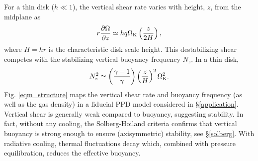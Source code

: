 \documentclass[iop, numberedappendix]{emulateapj}
\newcommand{\p}{\partial}
\def \OmK {\Omega_{\rm K}}
\begin{document}
For a thin disk ($h\ll 1$), the vertical shear rate varies with height, $z$, from the midplane as 
\begin{align}\label{vshear_thin}
  r \frac{\p \Omega }{\p z} \simeq  h q \OmK \left(\frac{z}{2 H}\right),
\end{align}
where $H=hr$ is the characteristic disk scale height. 
%
This destabilizing shear competes with the stabilizing vertical
buoyancy frequency $N_z$.  In a thin disk,     
\begin{align}\label{nz_thin}
  N_z^2 \simeq \left(\frac{\gamma-1}{\gamma}\right) \left(\frac{z}{H}\right)^2
  \OmK^2.  
\end{align}
Fig. \ref{eqm_structure} maps the vertical shear rate and buoyancy
frequency (as well as the gas density) 
in a fiducial PPD model considered in \S\ref{application}. 
Vertical shear is 
generally weak compared to buoyancy, suggesting stability. In fact, 
without any cooling, the Solberg-Hoiland criteria \citep{tassoul78}  
confirms that vertical buoyancy is strong
enough to ensure (axisymmetric) stability, see \S\ref{solberg}.  With radiative cooling, 
thermal fluctuations decay which, combined with pressure equilibration, reduces the effective buoyancy.

\end{document}
